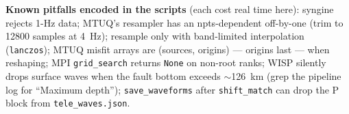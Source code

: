 \documentclass[11pt]{article}
\begin{document}
\textbf{Known pitfalls encoded in the scripts} (each cost real time here): syngine rejects
1-Hz data; MTUQ's resampler has an npts-dependent off-by-one (trim to 12800 samples at 4~Hz);
resample only with band-limited interpolation (\texttt{lanczos}); MTUQ misfit arrays are
(sources, origins) --- origins last --- when reshaping; MPI \texttt{grid\_search} returns
\texttt{None} on non-root ranks; WISP silently drops surface waves when the fault bottom
exceeds $\sim$126~km (grep the pipeline log for ``Maximum depth''); \texttt{save\_waveforms}
after \texttt{shift\_match} can drop the P block from \texttt{tele\_waves.json}.
\end{document}

